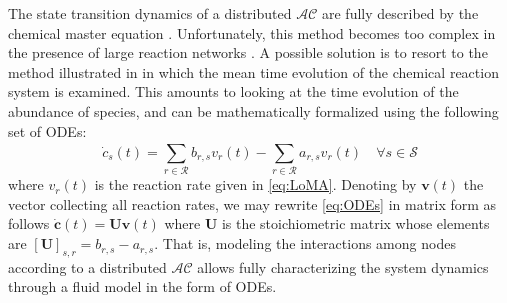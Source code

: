 \documentclass[journal]{IEEEtran}
\newcommand{\vet}[1]{\mathbf{#1}}
\newcommand{\mat}[1]{\mathbf{#1}}
\newcommand{\artChem}{$\mathcal{AC}$}
\begin{document}
{The state transition dynamics of a distributed \artChem{} are fully described by the chemical
master equation \cite{Mc67}. Unfortunately, this method becomes too complex in the presence of large reaction networks \cite{JaHu07}. A possible solution is to resort to the method illustrated in \cite{Gi00} in which the mean time evolution of the chemical reaction system is examined. This amounts to looking at the time evolution of the abundance of species, and can be mathematically formalized using the following set of ODEs: 
\begin{equation}\label{eq:ODEs}
{\dot c_{s}} (t)=  { 
	\sum\limits_{r \in {\mathcal{R}}}^{} b_{r,s} v_r(t)
}
 -
{ 
	\sum\limits_{r \in {\mathcal{R}}}^{} a_{r,s}
	 v_r(t) \quad \forall s \in \mathcal S
}
\end{equation}
where $v_r(t)$ is the reaction rate given in \eqref{eq:LoMA}. Denoting by $\vet{v}(t)$ the vector collecting all reaction rates, we may rewrite \eqref{eq:ODEs} in matrix form as follows $ \dot{\vet{c}}(t) = \mat{U} \vet{v}(t)$
where $\mat{U}$ is the stoichiometric matrix whose elements are $[\mat U]_{{s,r}}=b_{r,s}-a_{r,s}$.
{That is, modeling the interactions among nodes according to a distributed \artChem{} allows fully characterizing the system dynamics through a fluid model in the form of ODEs.}
}
\end{document}
